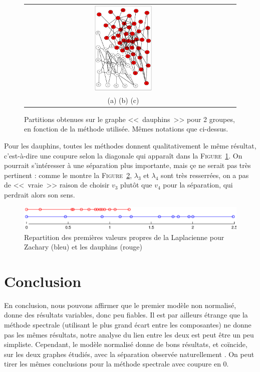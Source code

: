 \documentclass[12pt]{article}
\newcommand{\fig}[1]{\textsc{Figure}~\ref{#1}}
\begin{document}
\begin{figure}[bth]
	\begin{center}
		\begin{tabular}[h]{ccc}
		\includegraphics[width=0.30\textwidth]{do-m2-2}
		\vspace{-5mm}
		\\
		(a) (b) (c)
		\end{tabular}
	\end{center}
	\caption{Partitions obtenues sur le graphe <<~dauphins~>> pour 2 groupes, en fonction de la méthode utilisée. Mêmes notations que
	ci-dessus.}
	\label{fig:partitions-do}
\end{figure}

\medskip
Pour les dauphins, toutes les méthodes donnent qualitativement le même résultat, c'est-à-dire une coupure selon la diagonale qui
apparaît dans la \fig{fig:partitions-do}. On pourrait s'intéresser à une séparation plus importante, mais çe ne serait pas très
pertinent : comme le montre la \fig{fig:spectres}, $\lambda_3$ et $\lambda_4$ sont très resserrées, on a pas de <<~vraie~>> raison
de choisir $v_3$ plutôt que $v_4$ pour la séparation, qui perdrait alors son sens.

\begin{figure}[htb]
	\begin{center}
		\includegraphics[width=\textwidth]{new_plots/spectres}
	\end{center}
	\caption{Repartition des premières valeurs propres de la Laplacienne pour Zachary (bleu) et les dauphins (rouge)}
	\label{fig:spectres}
\end{figure}

\section{Conclusion} En conclusion, nous pouvons affirmer que le premier modèle non normalisé, donne des résultats variables, donc
peu fiables. Il est par ailleurs étrange que la méthode spectrale (utilisant le plus grand écart entre les composantes) ne donne
pas les mêmes résultats, notre analyse du lien entre les deux est peut être un peu simpliste. Cependant, le modèle normalisé donne
de bons résultats, et coïncide, sur les deux graphes étudiés, avec la séparation observée naturellement \cite{1}. On peut tirer
les mêmes conclusions pour la méthode spectrale avec coupure en 0.
\end{document}
